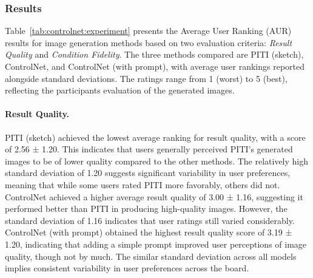 \subsubsection{Results}
Table~\ref{tab:controlnet:experiment} presents the Average User Ranking (AUR) results for image generation methods based on two evaluation criteria: \textit{Result Quality} and \textit{Condition Fidelity}. The three methods compared are PITI (sketch), ControlNet, and ControlNet (with prompt), with average user rankings reported alongside standard deviations. The ratings range from 1 (worst) to 5 (best), reflecting the participants evaluation of the generated images.

\paragraph{Result Quality.}
PITI (sketch) achieved the lowest average ranking for result quality, with a score of 2.56 ± 1.20. This indicates that users generally perceived PITI's generated images to be of lower quality compared to the other methods. The relatively high standard deviation of 1.20 suggests significant variability in user preferences, meaning that while some users rated PITI more favorably, others did not. ControlNet achieved a higher average result quality of 3.00 ± 1.16, suggesting it performed better than PITI in producing high-quality images. However, the standard deviation of 1.16 indicates that user ratings still varied considerably. ControlNet (with prompt) obtained the highest result quality score of 3.19 ± 1.20, indicating that adding a simple prompt improved user perceptions of image quality, though not by much. The similar standard deviation across all models implies consistent variability in user preferences across the board.

